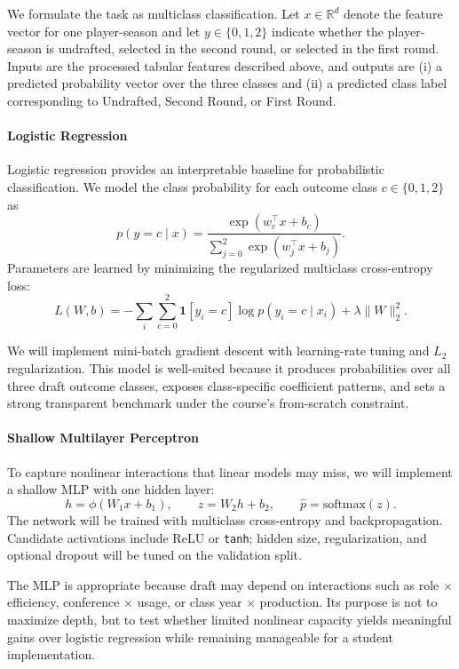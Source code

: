 We formulate the task as multiclass classification. Let $x \in \mathbb{R}^d$ denote the feature vector for one player-season and let $y \in \{0,1,2\}$ indicate whether the player-season is undrafted, selected in the second round, or selected in the first round. Inputs are the processed tabular features described above, and outputs are (i) a predicted probability vector over the three classes and (ii) a predicted class label corresponding to Undrafted, Second Round, or First Round.

\paragraph{Logistic Regression}
Logistic regression provides an interpretable baseline for probabilistic classification. We model the class probability for each outcome class $c \in \{0,1,2\}$ as
\[
p(y=c \mid x) = \frac{\exp(w_c^\top x + b_c)}{\sum_{j=0}^{2}\exp(w_j^\top x + b_j)}.
\]
Parameters are learned by minimizing the regularized multiclass cross-entropy loss:
\[
L(W,b) = -\sum_i \sum_{c=0}^{2} \mathbf{1}[y_i = c]\log p(y_i = c \mid x_i) + \lambda \lVert W \rVert_2^2.
\]

We will implement mini-batch gradient descent with learning-rate tuning and $L_2$ regularization. This model is well-suited because it produces probabilities over all three draft outcome classes, exposes class-specific coefficient patterns, and sets a strong transparent benchmark under the course's from-scratch constraint.

\paragraph{Shallow Multilayer Perceptron}
To capture nonlinear interactions that linear models may miss, we will implement a shallow MLP with one hidden layer:
\[
h = \phi(W_1 x + b_1), \qquad z = W_2 h + b_2, \qquad \hat{p} = \text{softmax}(z).
\]
The network will be trained with multiclass cross-entropy and backpropagation. Candidate activations include ReLU or \texttt{tanh}; hidden size, regularization, and optional dropout will be tuned on the validation split.

The MLP is appropriate because draft may depend on interactions such as role $\times$ efficiency, conference $\times$ usage, or class year $\times$ production. Its purpose is not to maximize depth, but to test whether limited nonlinear capacity yields meaningful gains over logistic regression while remaining manageable for a student implementation.

